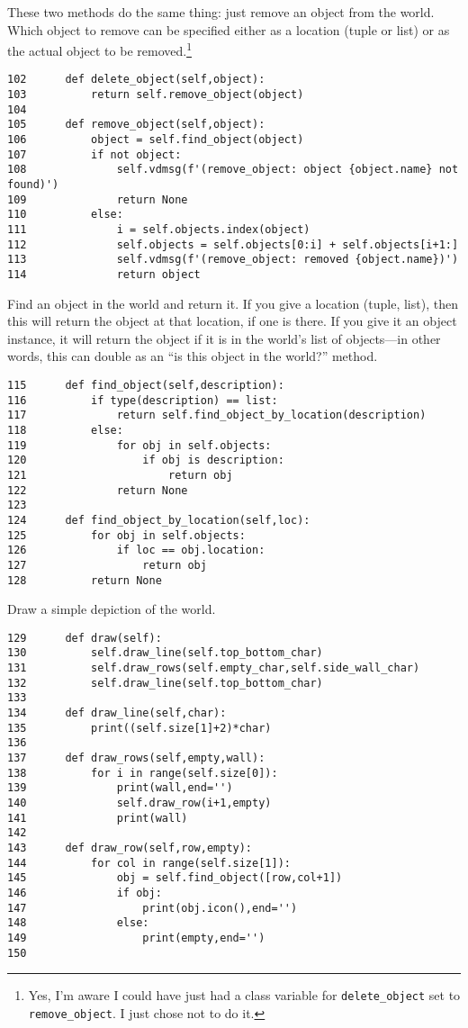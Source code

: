 \documentclass[11pt]{tufte-handout}
\begin{document}
These two methods do the same thing: just remove an object from the world.  Which object to remove can be specified either as a location (tuple or list) or as the actual object to be removed.\footnote{Yes, I'm aware I could have just had a class variable for \texttt{delete\_object} set to \texttt{remove\_object}.  I just chose not to do it.}

\begin{verbatim}
102      def delete_object(self,object):
103          return self.remove_object(object)
104  
105      def remove_object(self,object):
106          object = self.find_object(object)
107          if not object:
108              self.vdmsg(f'(remove_object: object {object.name} not found)')
109              return None
110          else:
111              i = self.objects.index(object)
112              self.objects = self.objects[0:i] + self.objects[i+1:]
113              self.vdmsg(f'(remove_object: removed {object.name})')
114              return object
\end{verbatim}

Find an object in the world and return it.  If you give a location (tuple, list), then this will return the object at that location, if one is there.  If you give it an object instance, it will return the object if it is in the world's list of objects---in other words, this can double as an ``is this object in the world?'' method.

\begin{verbatim}
115      def find_object(self,description):
116          if type(description) == list:
117              return self.find_object_by_location(description)
118          else:
119              for obj in self.objects:
120                  if obj is description:
121                      return obj
122              return None
123  
124      def find_object_by_location(self,loc):
125          for obj in self.objects:
126              if loc == obj.location:
127                  return obj
128          return None
\end{verbatim}

Draw a simple depiction of the world.

\begin{verbatim}
129      def draw(self):
130          self.draw_line(self.top_bottom_char)
131          self.draw_rows(self.empty_char,self.side_wall_char)
132          self.draw_line(self.top_bottom_char)
133          
134      def draw_line(self,char):
135          print((self.size[1]+2)*char)
136  
137      def draw_rows(self,empty,wall):
138          for i in range(self.size[0]):
139              print(wall,end='')
140              self.draw_row(i+1,empty)
141              print(wall)
142  
143      def draw_row(self,row,empty):
144          for col in range(self.size[1]):
145              obj = self.find_object([row,col+1])
146              if obj:
147                  print(obj.icon(),end='')
148              else:
149                  print(empty,end='')
150  
\end{verbatim}
\end{document}
